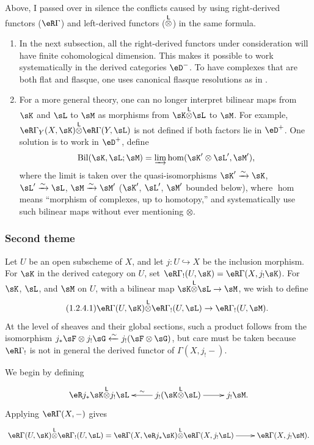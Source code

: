 Above, I passed over in silence the conflicts caused by using right-derived
functors ($\eR\Gamma$) and left-derived functors (${\overset{\mathsf{L}}{\otimes}}$) in the same
formula.
\begin{enumerate}[\indent a)]
  \item In the next subsection, all the right-derived functors under
    consideration will have finite cohomological dimension. This makes it
    possible to work systematically in the derived categories $\eD^-$. To
    have complexes that are both flat and flasque, one uses canonical
    flasque resolutions as in \cite[XVII]{sga4}.
  \item For a more general theory, one can no longer interpret bilinear maps
    from $\sK$ and $\sL$ to $\sM$ as morphisms from
    $\sK\lotimes\sL$ to $\sM$. For example,
    $\eR\Gamma_Y(X,\sK)\lotimes\eR\Gamma(Y,\sL)$ is not defined if both
    factors lie in $\eD^+$. One solution is to work in $\eD^+$, define
    \[
      \operatorname{Bil}(\sK,\sL;\sM) = \varinjlim \hom(\sK'\otimes\sL',\sM') \text{,}
    \]
    where the limit is taken over the quasi-isomorphisms $\sK'\iso \sK$,
    $\sL'\iso \sL$, $\sM\iso \sM'$ ($\sK'$, $\sL'$, $\sM'$ bounded
    below), where $\hom$ means ``morphism of complexes, up to homotopy,'' and
    systematically use such bilinear maps without ever mentioning
    $\otimes$.
\end{enumerate}





\subsubsection{Second theme}\label{IV:1-2-4}

Let $U$ be an open subscheme of $X$, and let $j:U\hookrightarrow X$ be the
inclusion morphism. For $\sK$ in the derived category on $U$, set
$\eR\Gamma_!(U,\sK)=\eR\Gamma(X,j_!\sK)$. For $\sK$, $\sL$, and $\sM$ on
$U$, with a bilinear map $\sK\lotimes\sL\to\sM$, we wish to define
\begin{equation*}\tag{1.2.4.1}\label{IV:eq:1-2-4-1}
  \eR\Gamma(U,\sK)\lotimes\eR\Gamma_!(U,\sL)\to\eR\Gamma_!(U,\sM) \text{.}
\end{equation*}
At the level of sheaves and their global sections, such a product follows
from the isomorphism
$j_*\sF\otimes j_!\sG\xleftarrow\sim j_!(\sF\otimes \sG)$, but care must be
taken because $\eR\Gamma_!$ is not in general the derived functor of
$\Gamma(X,j_!-)$.

We begin by defining
\[\xymatrix{
  \eR j_* \sK\lotimes j_! \sL
    & \ar[l]_-\sim j_!(\sK\lotimes \sL) \ar[r]
    & j_!\sM \text{.}
}\]
Applying $\eR\Gamma(X,-)$ gives
\[\xymatrix{
  \eR\Gamma(U,\sK)\lotimes\eR\Gamma_!(U,\sL) = \eR\Gamma(X,\eR j_*\sK)\lotimes \eR\Gamma(X,j_!\sL) \ar[r]
    & \eR\Gamma(X,j_! \sM) \text{.}
}\]

